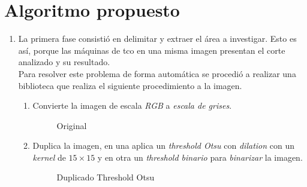\section{Algoritmo propuesto}
\begin{enumerate}
\item La primera fase consistió en delimitar y extraer el
  área a investigar. Esto es así, porque las
  máquinas de \gls{tco} en una misma
  imagen presentan el corte analizado y su resultado.\\
  Para resolver este problema de forma automática se procedió a
  realizar una biblioteca que realiza el siguiente procedimiento a la
  imagen.
  \begin{enumerate}[label*=\arabic*.]
  \item Convierte la imagen de escala \emph{RGB} a \emph{escala de
      grises}.

    \begin{figure}[H]
      \caption{Original}
      \centering \setlength\fboxsep{0pt} \setlength\fboxrule{0.5pt}
    \end{figure}

  \item Duplica la imagen, en una aplica un \emph{threshold
      Otsu} con
    \emph{dilation} con un \emph{kernel}
    de $15 \times 15$ y en otra un \emph{threshold
      binario} para
    \emph{binarizar} la imagen.
 
    \begin{figure}[H]
      \caption{Duplicado Threshold Otsu}
      \centering \setlength\fboxsep{0pt} \setlength\fboxrule{0.5pt}
    \end{figure}


\end{enumerate}
\end{enumerate}

